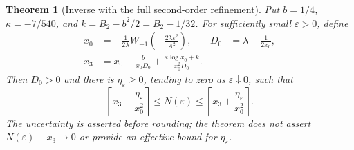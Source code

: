 \documentclass[11pt,letterpaper]{article}
\newtheorem{theorem}{Theorem}[section]
\theoremstyle{remark}\newtheorem{remark}[theorem]{Remark}
\numberwithin{equation}{section}
\begin{document}
\begin{theorem}[Inverse with the full second-order refinement]\label{ppg:log:thm:inverse}
Put $b=1/4$, $\kappa=-7/540$, and $k=B_2-b^2/2=B_2-1/32$. For sufficiently small $\varepsilon>0$, define
\begin{align}
 x_0&=-\frac1{2\lambda}W_{-1}\!\left(-\frac{2\lambda\varepsilon^2}{A^2}\right),
 &D_0&=\lambda-\frac1{2x_0},\label{ppg:log:eq:x0}\\
 x_3&=x_0+\frac{b}{x_0D_0}
             +\frac{\kappa\log x_0+k}{x_0^2D_0}.
 \label{ppg:log:eq:x3}
\end{align}
Then $D_0>0$ and there is $\eta_\varepsilon\ge0$, tending to zero as $\varepsilon\downarrow0$, such that
\begin{equation}\label{ppg:log:eq:ceilinverse}
 \left\lceil x_3-\frac{\eta_\varepsilon}{x_0^2}\right\rceil
 \le N(\varepsilon)\le
 \left\lceil x_3+\frac{\eta_\varepsilon}{x_0^2}\right\rceil.
\end{equation}
The uncertainty is asserted before rounding; the theorem does not assert $N(\varepsilon)-x_3\to0$ or provide an effective bound for $\eta_\varepsilon$.
\end{theorem}
\end{document}

